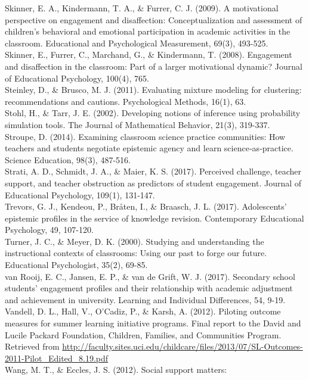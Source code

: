 \documentclass[]{msu-thesis}
\theoremstyle{definition}
\theoremstyle{definition}
\theoremstyle{definition}
\theoremstyle{remark}
\begin{document}
Skinner, E. A., Kindermann, T. A., \& Furrer, C. J. (2009). A
motivational perspective on engagement and disaffection:
Conceptualization and assessment of children's behavioral and emotional
participation in academic activities in the classroom. Educational and
Psychological Measurement, 69(3), 493-525.\\
Skinner, E., Furrer, C., Marchand, G., \& Kindermann, T. (2008).
Engagement and disaffection in the classroom: Part of a larger
motivational dynamic? Journal of Educational Psychology, 100(4), 765.\\
Steinley, D., \& Brusco, M. J. (2011). Evaluating mixture modeling for
clustering: recommendations and cautions. Psychological Methods, 16(1),
63.\\
Stohl, H., \& Tarr, J. E. (2002). Developing notions of inference using
probability simulation tools. The Journal of Mathematical Behavior,
21(3), 319-337.\\
Stroupe, D. (2014). Examining classroom science practice communities:
How teachers and students negotiate epistemic agency and learn
science‐as‐practice. Science Education, 98(3), 487-516.\\
Strati, A. D., Schmidt, J. A., \& Maier, K. S. (2017). Perceived
challenge, teacher support, and teacher obstruction as predictors of
student engagement. Journal of Educational Psychology, 109(1),
131-147.\\
Trevors, G. J., Kendeou, P., Bråten, I., \& Braasch, J. L. (2017).
Adolescents' epistemic profiles in the service of knowledge revision.
Contemporary Educational Psychology, 49, 107-120.\\
Turner, J. C., \& Meyer, D. K. (2000). Studying and understanding the
instructional contexts of classrooms: Using our past to forge our
future. Educational Psychologist, 35(2), 69-85.\\
van Rooij, E. C., Jansen, E. P., \& van de Grift, W. J. (2017).
Secondary school students' engagement profiles and their relationship
with academic adjustment and achievement in university. Learning and
Individual Differences, 54, 9-19.\\
Vandell, D. L., Hall, V., O'Cadiz, P., \& Karsh, A. (2012). Piloting
outcome measures for summer learning initiative programs. Final report
to the David and Lucile Packard Foundation, Children, Families, and
Communities Program. Retrieved from
\url{http://faculty.sites.uci.edu/childcare/files/2013/07/SL-Outcomes-2011-Pilot_Edited_8.19.pdf}\\
Wang, M. T., \& Eccles, J. S. (2012). Social support matters:
\end{document}
